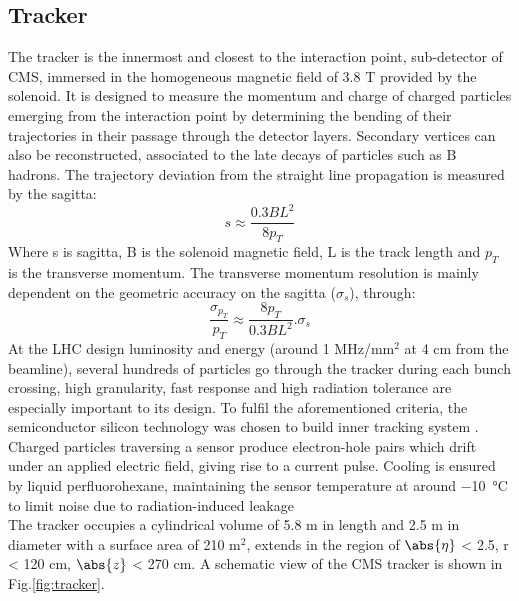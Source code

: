 \subsection{Tracker}
The tracker is the innermost and closest to the interaction point, sub-detector of CMS, immersed in the homogeneous magnetic field of 3.8 T provided by the solenoid.  It is designed to measure the momentum and charge of charged particles emerging from the interaction point by determining the bending of their trajectories in their passage through the detector layers. Secondary vertices can also be reconstructed, associated to the late decays of particles such as B hadrons. The trajectory deviation from the straight line propagation is measured by the sagitta:
\begin{equation}
s \approx \frac{0.3BL^{2}}{8p_{T}}
\end{equation}
Where s is sagitta, B is the solenoid magnetic field, L is the track length and $p_{T}$ is the transverse momentum. The transverse momentum resolution is mainly dependent on the geometric accuracy on the sagitta ($\sigma_{s}$), through:
\begin{equation}
 \frac{\sigma_{p_{T}}}{p_{T}} \approx \frac{8p_{T}}{0.3BL^{2}}.\sigma_{s}
\end{equation}
At the LHC design luminosity and energy (around 1 MHz/mm$^{2}$ at 4 cm from the beamline), several hundreds of particles go through the tracker during each bunch crossing, high granularity, fast response and high radiation tolerance are especially important to its design. To fulfil the aforementioned criteria, the semiconductor silicon technology was chosen to build inner tracking system \cite{tracker}. Charged particles traversing a sensor produce electron-hole pairs which drift under an applied electric field, giving rise to a current pulse. Cooling is ensured by liquid perfluorohexane, maintaining the sensor temperature at around \SI{-10}{\celsius} to limit noise due to radiation-induced leakage\\ 
The tracker occupies a cylindrical volume of 5.8 m in length and 2.5 m in diameter with a surface area of 210 m$^{2}$, extends in the region of $\abs{\eta}$ < 2.5, r < 120 cm, $\abs{z}$ < 270 cm. A schematic view of the CMS tracker is shown in Fig.\ref{fig:tracker}. 

